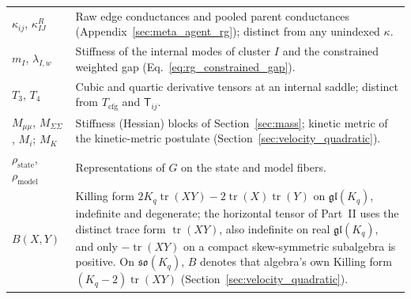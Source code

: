 \documentclass[11pt]{article}
\begin{document}
{\begin{longtable}{@{}p{}p{}@{}}
$\kappa_{ij}$, $\kappa^R_{IJ}$ & Raw edge conductances and pooled parent conductances (Appendix~\ref{sec:meta_agent_rg}); distinct from any unindexed $\kappa$. \\
$m_I$, $\lambda_{I,w}$ & Stiffness of the internal modes of cluster $I$ and the constrained weighted gap (Eq.~\eqref{eq:rg_constrained_gap}). \\
$T_3$, $T_4$ & Cubic and quartic derivative tensors at an internal saddle; distinct from $T_{\mathrm{cfg}}$ and $\mathsf{T}_{ij}$. \\
$M_{\mu\mu}$, $M_{\Sigma\Sigma}$, $M_i$; $M_K$ & Stiffness (Hessian) blocks of Section~\ref{sec:mass}; kinetic metric of the kinetic-metric postulate (Section~\ref{sec:velocity_quadratic}). \\
$\rho_{\mathrm{state}}$, $\rho_{\mathrm{model}}$ & Representations of $G$ on the state and model fibers. \\
$B(X,Y)$ & Killing form $2K_q\operatorname{tr}(XY)-2\operatorname{tr}(X)\operatorname{tr}(Y)$ on $\mathfrak{gl}(K_q)$, indefinite and degenerate; the horizontal tensor of Part~II uses the distinct trace form $\operatorname{tr}(XY)$, also indefinite on real $\mathfrak{gl}(K_q)$, and only $-\operatorname{tr}(XY)$ on a compact skew-symmetric subalgebra is positive. On $\mathfrak{so}(K_q)$, $B$ denotes that algebra's own Killing form $(K_q-2)\operatorname{tr}(XY)$ (Section~\ref{sec:velocity_quadratic}). \\
\end{longtable}}



\end{document}
